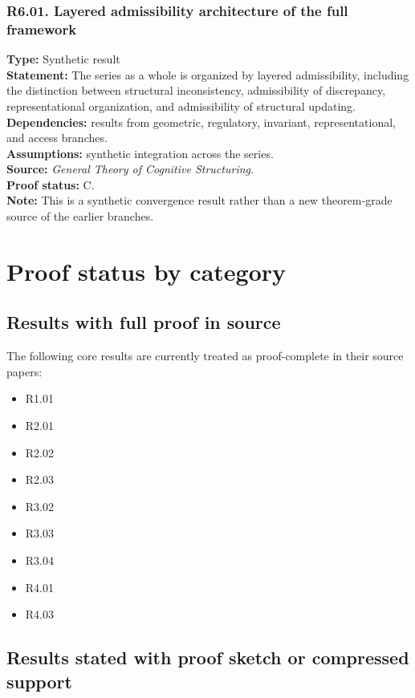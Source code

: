 \documentclass[12pt]{article}
\begin{document}
	\subsubsection*{R6.01. Layered admissibility architecture of the full framework}
	\textbf{Type:} Synthetic result \\
	\textbf{Statement:} The series as a whole is organized by layered admissibility, including the
	distinction between structural inconsistency, admissibility of discrepancy, representational
	organization, and admissibility of structural updating. \\
	\textbf{Dependencies:} results from geometric, regulatory, invariant, representational, and
	access branches. \\
	\textbf{Assumptions:} synthetic integration across the series. \\
	\textbf{Source:} \emph{General Theory of Cognitive Structuring}. \\
	\textbf{Proof status:} C. \\
	\textbf{Note:} This is a synthetic convergence result rather than a new theorem-grade source of
	the earlier branches.
	
	\section{Proof status by category}
	
	\subsection{Results with full proof in source}
	
	The following core results are currently treated as proof-complete in their source papers:
	\begin{itemize}[leftmargin=2em]
		\item R1.01
		\item R2.01
		\item R2.02
		\item R2.03
		\item R3.02
		\item R3.03
		\item R3.04
		\item R4.01
		\item R4.03
	\end{itemize}
	
	\subsection{Results stated with proof sketch or compressed support}
	
\end{document}
